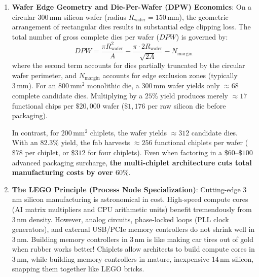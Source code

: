 \begin{enumerate}
    Under Murphy's model (Eq.~\ref{eq:yield_murphy}) with a typical defect density of $D_0 = 0.08\,\mathrm{defects/cm^2}$:
    \begin{itemize}
        \item A monolithic reticle-limit die of $800\,\mathrm{mm^2}$ ($A = 8.0\,\mathrm{cm^2}$) achieves a functional yield of only $Y \approx 25.1\%$. Nearly three out of four produced chips are discarded as scrap!
        \item Conversely, four partitioned chiplets of $200\,\mathrm{mm^2}$ each ($A = 2.0\,\mathrm{cm^2}$) achieve a yield of $Y \approx 82.3\%$ per chiplet.
    \end{itemize}

    \item \textbf{Wafer Edge Geometry and Die-Per-Wafer (DPW) Economics}: On a circular $300\,\mathrm{mm}$ silicon wafer (radius $R_{\mathrm{wafer}} = 150\,\mathrm{mm}$), the geometric arrangement of rectangular dies results in substantial edge clipping loss. The total number of gross complete dies per wafer ($DPW$) is governed by:
    \begin{equation}
    DPW = \frac{\pi R_{\mathrm{wafer}}^2}{A} - \frac{\pi \cdot 2 R_{\mathrm{wafer}}}{\sqrt{2 A}} - N_{\mathrm{margin}}
    \label{eq:dpw_formula}
    \end{equation}
    where the second term accounts for dies partially truncated by the circular wafer perimeter, and $N_{\mathrm{margin}}$ accounts for edge exclusion zones (typically $3\,\mathrm{mm}$). For an $800\,\mathrm{mm^2}$ monolithic die, a $300\,\mathrm{mm}$ wafer yields only $\approx 68$ complete candidate dies. Multiplying by a $25\%$ yield produces merely $\approx 17$ functional chips per $\$20,000$ wafer ($\$1,176$ per raw silicon die before packaging).

    In contrast, for $200\,\mathrm{mm^2}$ chiplets, the wafer yields $\approx 312$ candidate dies. With an $82.3\%$ yield, the fab harvests $\approx 256$ functional chiplets per wafer ($\$78$ per chiplet, or $\$312$ for four chiplets). Even when factoring in a $\$60\text{--}\$100$ advanced packaging surcharge, \textbf{the multi-chiplet architecture cuts total manufacturing costs by over $60\%$}.

    \item \textbf{The LEGO Principle (Process Node Specialization)}: Cutting-edge 3\,nm silicon manufacturing is astronomical in cost. High-speed compute cores (AI matrix multipliers and CPU arithmetic units) benefit tremendously from 3\,nm density. However, analog circuits, phase-locked loops (PLL clock generators), and external USB/PCIe memory controllers do not shrink well in 3\,nm. Building memory controllers in 3\,nm is like making car tires out of gold when rubber works better! Chiplets allow architects to build compute cores in 3\,nm, while building memory controllers in mature, inexpensive 14\,nm silicon, snapping them together like LEGO bricks.
\end{enumerate}

